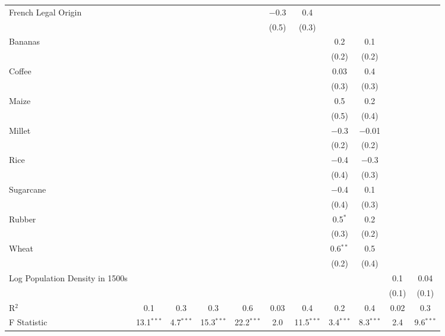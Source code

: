 \begin{table}[!htbp]
\begin{threeparttable}
\begin{tabular}{@{\extracolsep{0pt}}lcccccccccc}
  French Legal Origin &  &  &  &  & $-$0.3 & 0.4 &  &  &  &  \\ 
  &  &  &  &  & (0.5) & (0.3) &  &  &  &  \\ 
  Bananas &  &  &  &  &  &  & 0.2 & 0.1 &  &  \\ 
  &  &  &  &  &  &  & (0.2) & (0.2) &  &  \\ 
  Coffee &  &  &  &  &  &  & 0.03 & 0.4 &  &  \\ 
  &  &  &  &  &  &  & (0.3) & (0.3) &  &  \\ 
  Maize &  &  &  &  &  &  & 0.5 & 0.2 &  &  \\ 
  &  &  &  &  &  &  & (0.5) & (0.4) &  &  \\ 
  Millet &  &  &  &  &  &  & $-$0.3 & $-$0.01 &  &  \\ 
  &  &  &  &  &  &  & (0.2) & (0.2) &  &  \\ 
  Rice &  &  &  &  &  &  & $-$0.4 & $-$0.3 &  &  \\ 
  &  &  &  &  &  &  & (0.4) & (0.3) &  &  \\ 
  Sugarcane &  &  &  &  &  &  & $-$0.4 & 0.1 &  &  \\ 
  &  &  &  &  &  &  & (0.4) & (0.3) &  &  \\ 
  Rubber &  &  &  &  &  &  & 0.5$^{*}$ & 0.2 &  &  \\ 
  &  &  &  &  &  &  & (0.3) & (0.2) &  &  \\ 
  Wheat &  &  &  &  &  &  & 0.6$^{**}$ & 0.5 &  &  \\ 
  &  &  &  &  &  &  & (0.2) & (0.4) &  &  \\ 
  Log Population Density in 1500s &  &  &  &  &  &  &  &  & 0.1 & 0.04 \\ 
  &  &  &  &  &  &  &  &  & (0.1) & (0.1) \\ 
R$^{2}$ & 0.1 & 0.3 & 0.3 & 0.6 & 0.03 & 0.4 & 0.2 & 0.4 & 0.02 & 0.3 \\ 
F Statistic & 13.1$^{***}$ & 4.7$^{***}$ & 15.3$^{***}$ & 22.2$^{***}$ & 2.0 & 11.5$^{***}$ & 3.4$^{***}$ & 8.3$^{***}$ & 2.4 & 9.6$^{***}$ \\ 


\end{tabular}
\end{threeparttable}
\end{table}
